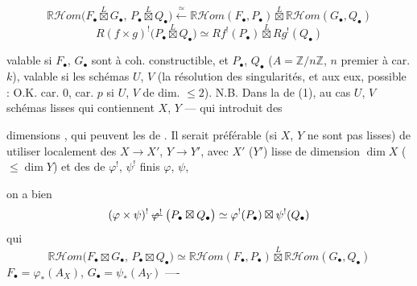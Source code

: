 \documentclass[11pt,a4paper]{article}
\begin{document}

\[
\mathbb{R}\mathcal{H}om\bigl(F_\bullet \overset{L}{\boxtimes} G_\bullet,\, P_\bullet \overset{L}{\boxtimes} Q_\bullet\bigr) \xleftarrow{\;\simeq\;} \mathbb{R}\mathcal{H}om(F_\bullet, P_\bullet) \overset{L}{\boxtimes} \mathbb{R}\mathcal{H}om(G_\bullet, Q_\bullet)
\]
\[
R(f\times g)^!\bigl(P_\bullet \overset{L}{\boxtimes} Q_\bullet\bigr) \simeq Rf^!(P_\bullet) \overset{L}{\boxtimes} Rg^!(Q_\bullet)
\]

valable si $F_\bullet$, $G_\bullet$ sont     \struck{\ill{}} à coh. constructible, et $P_\bullet$, $Q_\bullet$  ($A = \mathbb{Z}/n\mathbb{Z}$, $n$ premier à car. $k$),
  valable si    les schémas $U$, $V$ (la résolution des singularités, et aux   eux, \struck{\ill{}}
 possible : O.K.  car. 0,   car. $p$  si $U$, $V$ de dim.
$\leq 2$). N.B. Dans la  de (1),    au cas  $U$, $V$  schémas lisses
qui contiennent $X$, $Y$ —  qui introduit des

dimensions , qui peuvent  les  de . Il serait préférable \struck{\ill{}} (si $X$, $Y$ ne sont pas  lisses) de \struck{\ill{}}  utiliser localement des   $X\to X'$, $Y\to Y'$, avec $X'$ ($Y'$) lisse de dimension \struck{\ill{}}   $\dim X$ ($\leq \dim Y$)
et des     de $\varphi^!$, $\psi^!$     finis $\varphi$, $\psi$,


on a bien
\[
(\varphi\times\psi)^!\;\text{\struck{$\varphi^!$}}\;\bigl(P_\bullet \boxtimes Q_\bullet\bigr) \simeq \varphi^!(P_\bullet)\boxtimes\psi^!(Q_\bullet)
\]
 qui 
\[
\mathbb{R}\mathcal{H}om\bigl(F_\bullet\boxtimes G_\bullet,\, P_\bullet\boxtimes Q_\bullet\bigr) \simeq \mathbb{R}\mathcal{H}om(F_\bullet, P_\bullet)\overset{L}{\boxtimes}\mathbb{R}\mathcal{H}om(G_\bullet, Q_\bullet)
\]
 $F_\bullet = \varphi_*(A_X)$, $G_\bullet = \psi_*(A_Y)$ ----
\end{document}
